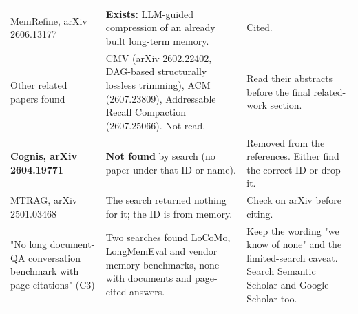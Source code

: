 \begin{table}[t]
{\begin{tabular}{lll}
MemRefine, arXiv 2606.13177 & \textbf{Exists:} LLM-guided compression of an already built long-term memory. & Cited. \\
Other related papers found & CMV (arXiv 2602.22402, DAG-based structurally lossless trimming), ACM (2607.23809), Addressable Recall Compaction (2607.25066). Not read. & Read their abstracts before the final related-work section. \\
\textbf{Cognis, arXiv 2604.19771} & \textbf{Not found} by search (no paper under that ID or name). & Removed from the references. Either find the correct ID or drop it. \\
MTRAG, arXiv 2501.03468 & The search returned nothing for it; the ID is from memory. & Check on arXiv before citing. \\
"No long document-QA conversation benchmark with page citations" (C3) & Two searches found LoCoMo, LongMemEval and vendor memory benchmarks, none with documents and page-cited answers. & Keep the wording "we know of none" and the limited-search caveat. Search Semantic Scholar and Google Scholar too. \\
\bottomrule
\end{tabular}}
\end{table}
